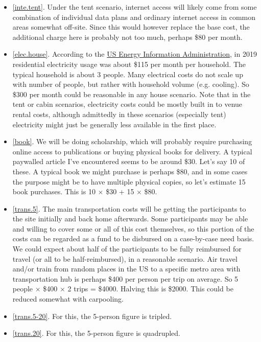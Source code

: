 \documentclass[10pt]{article}
\begin{document}
\begin{itemize}[leftmargin=*]
  \item[]{\ref{inte.tent}. Under the tent scenario, internet access will likely come from some combination of individual data plans and ordinary internet access in common areas somewhat off-site. Since this would however replace the base cost, the additional charge here is probably not too much, perhaps \$80 per month.}
  \item[]{\ref{elec.house}. According to the \href{https://www.eia.gov/todayinenergy/detail.php?id=46276#:~:text=In%202019%2C%20the%20average%20monthly,%24118%20to%20%24115%20per%20month.}{US Energy Information Administration}, in 2019 residential electricity usage was about \$115 per month per household. The typical household is about 3 people. Many electrical costs do not scale up with number of people, but rather with household volume (e.g. cooling). So \$300 per month could be reasonable in any house scenario. Note that in the tent or cabin scenarios, electricity costs could be mostly built in to venue rental costs, although admittedly in these scenarios (especially tent) electricity might just be generally less available in the first place.}
  \item[]{\ref{book}. We will be doing scholarship, which will probably require purchasing online access to publications or buying physical books for delivery. A typical paywalled article I've encountered seems to be around \$30. Let's say 10 of these. A typical book we might purchase is perhaps \$80, and in some cases the purpose might be to have multiple physical copies, so let's estimate 15 book purchases. This is 10 $\times$ \$30 + 15 $\times$ \$80.}
  \item[]{\ref{trans.5}. The main transportation costs will be getting the participants to the site initially and back home afterwards. Some participants may be able and willing to cover some or all of this cost themselves, so this portion of the costs can be regarded as a fund to be disbursed on a case-by-case need basis. We could expect about half of the participants to be fully reimbursed for travel (or all to be half-reimbursed), in a reasonable scenario. Air travel and/or train from random places in the US to a specific metro area with transportation hub is perhaps \$400 per person per trip on average. So 5 people $\times$ \$400 $\times$ 2 trips = \$4000. Halving this is \$2000. This could be reduced somewhat with carpooling.}
  \item[]{\ref{trans.5-20}. For this, the 5-person figure is tripled.}
  \item[]{\ref{trans.20}. For this, the 5-person figure is quadrupled.}

\end{itemize}
\end{document}
